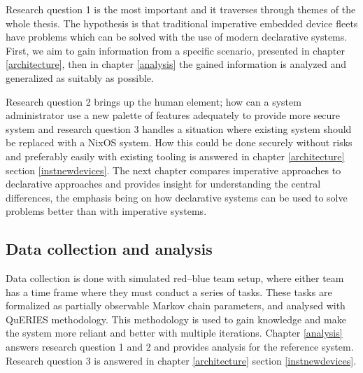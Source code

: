 Research question 1 is the most important and it traverses through
themes of the whole thesis. The hypothesis is that traditional
imperative embedded device fleets have problems which can be solved
with the use of modern declarative systems. First, we aim to gain
information from a specific scenario, presented in chapter
\ref{architecture}, then in chapter \ref{analysis} the gained
information is analyzed and generalized as suitably as possible.

Research question 2 brings up the human element; how can a system
administrator use a new palette of features adequately to provide more
secure system and research question 3 handles a situation where
existing system should be replaced with a NixOS system. How this could
be done securely without risks and preferably easily with existing
tooling is answered in chapter \ref{architecture} section
\ref{instnewdevices}. The next chapter compares imperative approaches
to declarative approaches and provides insight for understanding the
central differences, the emphasis being on how declarative systems can be
used to solve problems better than with imperative systems.

\subsection{Data collection and analysis}

Data collection is done with simulated red–blue team setup, where
either team has a time frame where they must conduct a series of
tasks. These tasks are formalized as partially observable Markov chain
parameters, and analysed with QuERIES methodology. This methodology is
used to gain knowledge and make the system more reliant and better
with multiple iterations. Chapter \ref{analysis} answers research
question 1 and 2 and provides analysis for the reference
system. Research question 3 is answered in chapter \ref{architecture}
section \ref{instnewdevices}.
